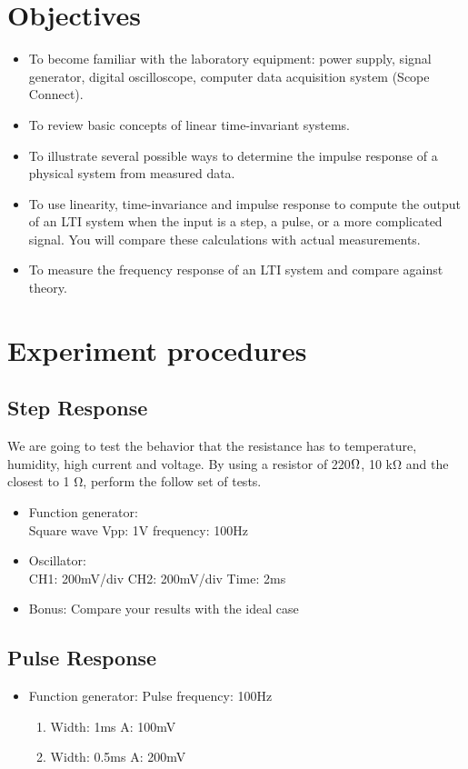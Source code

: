 \documentclass{article}
\begin{document}
\section{Objectives}
\begin{itemize}
	\item To become familiar with the laboratory equipment: power supply, signal generator, digital oscilloscope,
computer data acquisition system (Scope Connect).
	\item To review basic concepts of linear time-invariant systems.
	\item To illustrate several possible ways to determine the impulse response of a physical system from measured
data.
	\item To use linearity, time-invariance and impulse response to compute the output of an LTI system when
the input is a step, a pulse, or a more complicated signal. You will compare these calculations with
actual measurements.
	\item To measure the frequency response of an LTI system and compare against theory.
\end{itemize}

\section{Experiment procedures}

\subsection{Step Response}
We are going to test the behavior that the resistance has to temperature, humidity,
high current and voltage. By using a resistor of 220$\rm\Omega$, 10 kΩ and the closest to 1 Ω,
perform the follow set of tests.
\begin{itemize}
	\item Function generator:\\
	Square wave \qquad Vpp: 1V \qquad frequency: 100Hz
	\item Oscillator:\\
	CH1: 200mV/div \qquad CH2: 200mV/div \qquad Time: 2ms
	\item Bonus: Compare your results with the ideal case
\end{itemize}

\subsection{Pulse Response}
\begin{itemize}
	\item Function generator: Pulse frequency: 100Hz
	\begin{enumerate}
		\item Width: 1ms \qquad A: 100mV
		\item Width: 0.5ms \qquad A: 200mV
	\end{enumerate}
\end{itemize}
\end{document}
